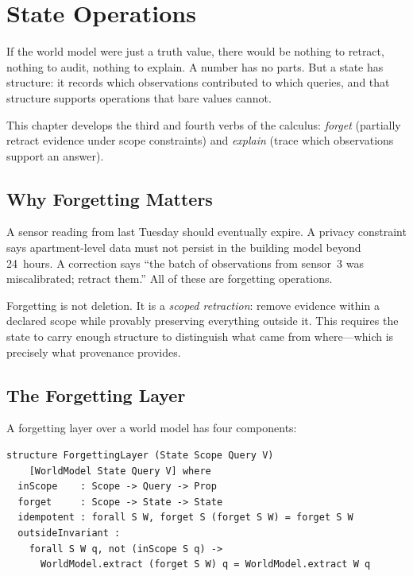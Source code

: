 \documentclass[11pt,openany]{report}
\begin{document}

\chapter{State Operations}
\label{ch:state-ops}

If the world model were just a truth value, there would be nothing to
retract, nothing to audit, nothing to explain.  A number has no parts.
But a state has structure: it records which observations contributed to
which queries, and that structure supports operations that bare values
cannot.

This chapter develops the third and fourth verbs of the calculus:
\emph{forget} (partially retract evidence under scope constraints) and
\emph{explain} (trace which observations support an answer).

\section{Why Forgetting Matters}

A sensor reading from last Tuesday should eventually expire.  A privacy
constraint says apartment-level data must not persist in the building
model beyond 24~hours.  A correction says ``the batch of observations
from sensor~3 was miscalibrated; retract them.''  All of these are
forgetting operations.

Forgetting is not deletion.  It is a \emph{scoped retraction}: remove
evidence within a declared scope while provably preserving everything
outside it.  This requires the state to carry enough structure to
distinguish what came from where---which is precisely what provenance
provides.

\section{The Forgetting Layer}
\label{sec:forgetting}

A forgetting layer over a world model has four components:

\begin{lstlisting}[language={}]
structure ForgettingLayer (State Scope Query V)
    [WorldModel State Query V] where
  inScope    : Scope -> Query -> Prop
  forget     : Scope -> State -> State
  idempotent : forall S W, forget S (forget S W) = forget S W
  outsideInvariant :
    forall S W q, not (inScope S q) ->
      WorldModel.extract (forget S W) q = WorldModel.extract W q
\end{lstlisting}
\end{document}

